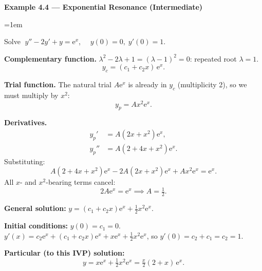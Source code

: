 \documentclass[12pt,a4paper]{article}
\newenvironment{example}[1]{%
  \vspace{0.8em}
  \noindent{\footnotesize\scshape\color{orange!50!black} Example}\par
  \noindent\textbf{#1}\par\vspace{0.3em}
  \begin{list}{}{\leftmargin=1em\rightmargin=0pt}\item
}{%
  \end{list}\vspace{0.8em}
}
\newcommand{\ee}{\mathrm{e}}
\begin{document}

\begin{example}{Example 4.4 --- Exponential Resonance (Intermediate)}
Solve $\;y'' - 2y' + y = \ee^{x}$, $\quad y(0)=0,\;y'(0)=1$.

\medskip
\textbf{Complementary function.}
$\lambda^2 - 2\lambda + 1 = (\lambda-1)^2 = 0$: repeated root $\lambda=1$.
\[
  y_c = (c_1 + c_2 x)\,\ee^x.
\]

\textbf{Trial function.} The natural trial $A\ee^x$ is already in $y_c$
(multiplicity 2), so we must multiply by $x^2$:
\[
  y_p = Ax^2\ee^x.
\]

\textbf{Derivatives.}
\begin{align*}
  y_p' &= A(2x + x^2)\ee^x,\\
  y_p'' &= A(2 + 4x + x^2)\ee^x.
\end{align*}
Substituting:
\[
  A(2+4x+x^2)\ee^x - 2A(2x+x^2)\ee^x + Ax^2\ee^x = \ee^x.
\]
All $x$- and $x^2$-bearing terms cancel:
\[
  2A\ee^x = \ee^x \implies A = \tfrac{1}{2}.
\]

\textbf{General solution:} $y = (c_1 + c_2 x)\ee^x + \tfrac{1}{2}x^2\ee^x$.

\textbf{Initial conditions:}
$y(0) = c_1 = 0$.
$y'(x) = c_2\ee^x + (c_1+c_2 x)\ee^x + x\ee^x + \tfrac{1}{2}x^2\ee^x$, so
$y'(0) = c_2 + c_1 = c_2 = 1$.

\textbf{Particular (to this IVP) solution:}
\[
  \boxed{y = x\ee^x + \tfrac{1}{2}x^2\ee^x = \tfrac{x}{2}(2+x)\,\ee^x.}
\]
\end{example}

\end{document}
